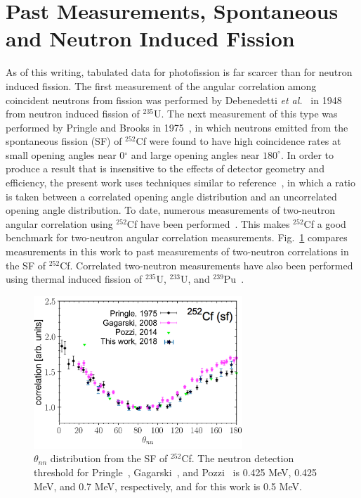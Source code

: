 \section{Past Measurements, Spontaneous and Neutron Induced Fission}
As of this writing, tabulated data for photofission is far scarcer than for neutron induced fission.
The first measurement of the angular correlation among coincident neutrons from fission was performed by Debenedetti \emph{et al.}~\cite{1948twoNCorr} in 1948 from neutron induced fission of $^{235}\text{U}$.
The next measurement of this type was performed by Pringle and Brooks in 1975~\cite{1975Cf252}, in which neutrons emitted from the spontaneous fission (SF) of $^{252}$Cf were found to have high coincidence rates at small opening angles near 0$^{\circ}$ and large opening angles near $180^{\circ}$.
In order to produce a result that is insensitive to the effects of detector geometry and efficiency, the present work uses techniques similar to reference~\cite{1975Cf252}, in which a ratio is taken between a correlated opening angle distribution and an uncorrelated opening angle distribution.
To date, numerous measurements of two-neutron angular correlation using $^{252}$Cf have been performed~\cite{Verbeke2018, Pozzi2014, 2008CF252, 1975Cf252}.
This makes $^{252}$Cf a good benchmark for two-neutron angular correlation measurements.
Fig.~\ref{fig:Cf252_us_vs_them} compares measurements in this work to past measurements of two-neutron correlations in the SF of $^{252}$Cf.
Correlated two-neutron measurements have also been performed using thermal induced fission of $^{235}$U, $^{233}$U, and $^{239}$Pu~\cite{Sokolov2010}.
\begin{figure}[h]
\includegraphics[width=0.7\textwidth]{Content/Introduction/Cf252_us_vs_them.png}
\caption{$\theta_{nn}$ distribution from the SF of $^{252}$Cf.
 The neutron detection threshold for Pringle~\cite{1975Cf252}, Gagarski~\cite{2008CF252}, and Pozzi~\cite{Pozzi2016} is 0.425 MeV, 0.425 MeV, and 0.7 MeV, respectively, and for this work is 0.5 MeV.
}
\label{fig:Cf252_us_vs_them}
\end{figure}

